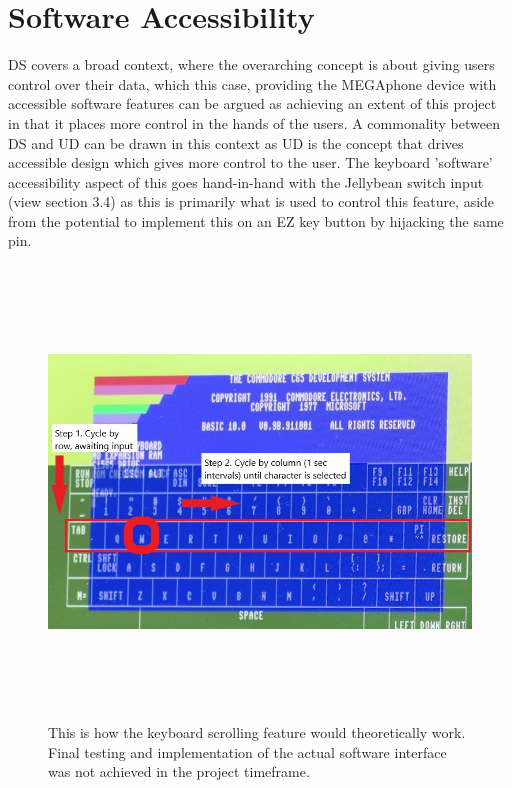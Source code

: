\section{Software Accessibility}
DS covers a broad context, where the overarching concept is about giving users control over their data, which this case, providing the MEGAphone device with accessible software features can be argued as achieving an extent of this project in that it places more control in the hands of the users.
A commonality between DS and UD can be drawn in this context as UD is the concept that drives accessible design which gives more control to the user.
The keyboard 'software' accessibility aspect of this goes hand-in-hand with the Jellybean switch input (view section 3.4) as this is primarily what is used to control this feature, aside from the potential to implement this on an EZ key button by hijacking the same pin.

\begin{figure} [h]
    \centering
    \includegraphics[width=12cm,height=12cm,keepaspectratio]{Figures/keyboard.jpg}
    \caption{This is how the keyboard scrolling feature would theoretically work. Final testing and implementation of the actual software interface was not achieved in the project timeframe.}
    \label{fig:Keyboard}
\end{figure}

